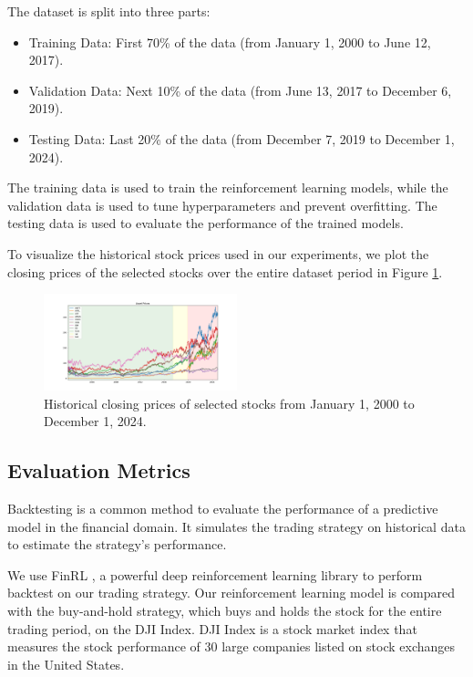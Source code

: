 \documentclass[conference]{IEEEtran}
\begin{document}
The dataset is split into three parts:
\begin{itemize}
  \item Training Data: First 70\% of the data (from January 1, 2000 to June 12, 2017).
  \item Validation Data: Next 10\% of the data (from June 13, 2017 to December 6, 2019).
  \item Testing Data: Last 20\% of the data (from December 7, 2019 to December 1, 2024).
\end{itemize}

The training data is used to train the reinforcement learning models, while the validation data is used to tune hyperparameters and prevent overfitting. The testing data is used to evaluate the performance of the trained models.

To visualize the historical stock prices used in our experiments, we plot the closing prices of the selected stocks over the entire dataset period in Figure \ref{fig:price_history}.

\begin{figure}[htbp]
  \centerline{\includegraphics[width=0.5\textwidth]{figs/prices.png}}
  \caption{Historical closing prices of selected stocks from January 1, 2000 to December 1, 2024.}
  \label{fig:price_history}
\end{figure}

\subsection{Evaluation Metrics}

Backtesting is a common method to evaluate the performance of a predictive model in the financial domain. It simulates the trading strategy on historical data to estimate the strategy's performance.

We use FinRL \cite{liu2022finrl}, a powerful deep reinforcement learning library to perform backtest on our trading strategy. Our reinforcement learning model is compared with the buy-and-hold strategy, which buys and holds the stock for the entire trading period, on the DJI Index. DJI Index is a stock market index that measures the stock performance of 30 large companies listed on stock exchanges in the United States.
\end{document}
